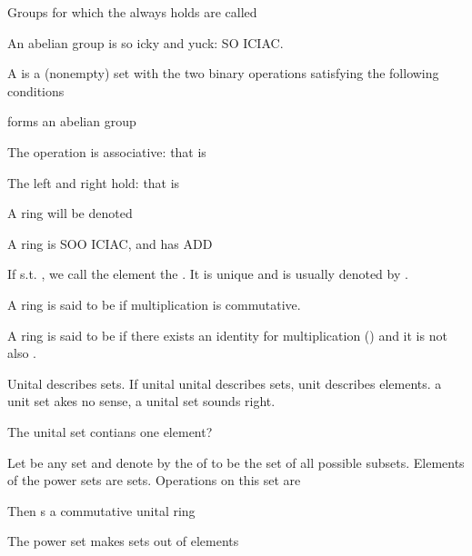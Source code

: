 \begin{D} Groups for which the   always holds are called  \end{D}
\begin{R} An abelian group is so icky and yuck: SO ICIAC. \end{R}

\begin{D}
A  is a (nonempty) set  with the two binary operations \e{$+,\times$} satisfying the following conditions 
\begin{compactitem}
\item {} forms an abelian group
\item The operation \e{$\times$} is associative: that is 
\item The left and right  hold: that is 
\end{compactitem} A ring will be denoted  \end{D}
\begin{R} A ring is SOO ICIAC, and has ADD \end{R}

\begin{D} If  s.t. , we call the element  the . It is unique and is usually denoted by . \end{D}

\begin{D} A ring  is said to be  if multiplication is commutative. \end{D}
\begin{D} A ring  is said to be  if there exists an identity for multiplication () and it is not also . \end{D}
\begin{R} Unital describes sets. If unital unital describes sets, unit describes elements. a unit set akes no sense, a unital set sounds right. \end{R}
\begin{R} The unital set contians one element?\end{R}

\begin{D} Let  be any set and denote by  the  of  to be the set of all possible subsets. Elements of the power sets are sets.
Operations on this set are 
\begin{compactitem}
\item {}
\item {}
\end{compactitem}
Then  s a commutative unital ring \end{D}
\begin{R} The power set makes sets out of elements \end{R}

